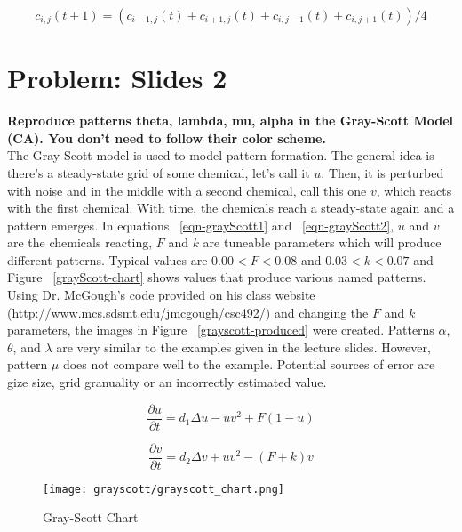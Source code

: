 \begin{equation}
c_{i,j}(t+1) = ( c_{i-1,j}(t) + c_{i+1,j}(t) + c_{i,j-1}(t) + c_{i,j+1}(t)) / 4
\end{equation} \label{heatDiscrete}

\section{Problem: Slides 2}
\textbf{ Reproduce patterns theta, lambda, mu, alpha in the Gray-Scott Model (CA). You don't need to follow their color scheme. } \\
\newline
The Gray-Scott model is used to model pattern formation. The general idea is there's a steady-state grid of some chemical, let's call it $u$. Then, it is perturbed with noise and in the middle with a second chemical, call this one $v$, which reacts with the first chemical. With time, the chemicals reach a steady-state again and a pattern emerges. In equations ~\ref{eqn-grayScott1} and ~\ref{eqn-grayScott2}, $u$ and $v$ are the chemicals reacting, $F$ and $k$ are tuneable parameters which will produce different patterns. Typical values are $ 0.00 < F < 0.08 $ and $ 0.03 < k < 0.07 $ and Figure ~\ref{grayScott-chart} shows values that produce various named patterns.\\

  Using Dr. McGough's code provided on his class website (http://www.mcs.sdsmt.edu/jmcgough/csc492/) and changing the $F$ and $k$ parameters, the images in Figure ~\ref{grayscott-produced} were created. Patterns $\alpha$, $\theta$, and  $\lambda$ are very similar to the examples given in the lecture slides. However, pattern $\mu$ does not compare well to the example. Potential sources of error are gize size, grid granuality or an incorrectly estimated value.

\begin{equation}
\frac{ \partial u}{ \partial t } = d_1  \Delta u - uv^2 + F(1-u)
\end{equation} \label{eqn-grayScott1}

\begin{equation}
\frac{ \partial v}{ \partial t } = d_2 \Delta v + uv^2 - (F+k)v
\end{equation} \label{eqn-grayScott2}

\begin{figure}[tbh]
\begin{center}
\texttt{[image: grayscott/grayscott\_chart.png]}
\caption{ Gray-Scott Chart }
\end{center}
\end{figure}\label{grayScott-chart}

